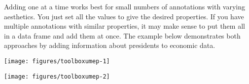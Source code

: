 Adding one at a time works best for small numbers of annotations with
varying aesthetics. You just set all the values to give the desired
properties. If you have multiple annotations with similar properties, it
may make sense to put them all in a data frame and add them at once. The
example below demonstrates both approaches by adding information about
presidents to economic data.

\begin{Shaded}
\begin{Highlighting}[]
\NormalTok{>}\StringTok{ }\StringTok{ }\NormalTok{, }
\NormalTok{+}\StringTok{                 } \NormalTok{, } \NormalTok{))}
\end{Highlighting}
\end{Shaded}

\begin{flushleft}\texttt{[image: figures/toolboxumep-1]} \end{flushleft}

\begin{Shaded}
\begin{Highlighting}[]
\NormalTok{>}\StringTok{ }
\ErrorTok{>}\StringTok{ }\StringTok{ }\NormalTok{presidential[-(}\NormalTok{:}\NormalTok{), ]}
\NormalTok{>}\StringTok{ }
\ErrorTok{>}\StringTok{ }\StringTok{ }
\NormalTok{>}\StringTok{ }\StringTok{ }
\NormalTok{>}\StringTok{ }\StringTok{ }\NormalTok{(}\NormalTok{(}  
\end{Highlighting}
\end{Shaded}

\begin{flushleft}\texttt{[image: figures/toolboxumep-2]} \end{flushleft}

